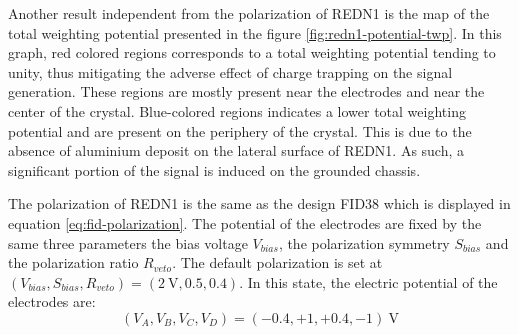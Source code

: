 Another result independent from the polarization of REDN1 is the map of the total weighting potential presented in the figure \ref{fig:redn1-potential-twp}.
In this graph, red colored regions corresponds to a total weighting potential tending to unity, thus mitigating the adverse effect of charge trapping on the signal generation. These regions are mostly present near the electrodes and near the center of the crystal. 
Blue-colored regions indicates a lower total weighting potential and are present on the periphery of the crystal. This is due to the absence of aluminium deposit on the lateral surface of REDN1. As such, a significant portion of the signal is induced on the grounded chassis.

The polarization of REDN1 is the same as the design FID38 which is displayed in equation \ref{eq:fid-polarization}. The potential of the electrodes are fixed by the same three parameters the bias voltage $V_{bias}$, the polarization symmetry $S_{bias}$ and the polarization ratio $R_{veto}$.
The default polarization is set at $\left( V_{bias}, S_{bias}, R_{veto} \right) = (\SI{2}{\volt}, 0.5, 0.4)$. In this state, the electric potential of the electrodes are:
\begin{equation}
(V_A, V_B, V_C, V_D) = (-0.4, +1, +0.4, -1)\ \si{\volt}
\end{equation}

